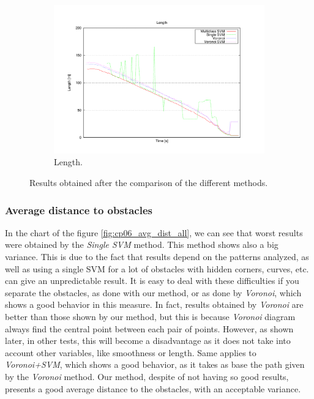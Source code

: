 \begin{figure}[h!]
  \ContinuedFloat
  \begin{subfigure}[b]{\textwidth}
	  \centering
	  \includegraphics[width=\textwidth,height=0.5\textwidth, trim=55 50 85 60,clip]{figure13}
	  \caption{Length.}
	  \label{fig:cp06_length_all}
  \end{subfigure}
  
  \caption{Results obtained after the comparison of the different methods.}\label{fig:cp06_results_comparison}
\end{figure}

\subsubsection{Average distance to obstacles}\label{ch:chapter06_02_02_01}

In the chart of the figure \ref{fig:cp06_avg_dist_all}, we can see that worst results were obtained by the \textit{Single \ac{SVM}} method. This method shows also a big variance. This is due to the fact that results depend on the patterns analyzed, as well as using a single \ac{SVM} for a lot of obstacles with hidden corners, curves, etc. can give an unpredictable result. It is easy to deal with these difficulties if you separate the obstacles, as done with our method, or as done by \textit{Voronoi}, which shows a good behavior in this measure. In fact, results obtained by \textit{Voronoi} are better than those shown by our method, but this is because \textit{Voronoi} diagram always find the central point between each pair of points. However, as shown later, in other tests, this will become a disadvantage as it does not take into account other variables, like smoothness or length. Same applies to \textit{Voronoi+\ac{SVM}}, which shows a good behavior, as it takes as base the path given by the \textit{Voronoi} method.
Our method, despite of not having so good results, presents a good average distance to the obstacles, with an acceptable variance.

